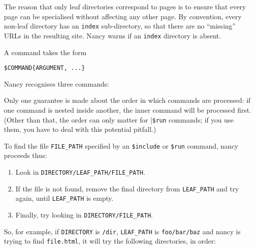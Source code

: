 \documentclass[english]{scrartcl}
\begin{document}
The reason that only leaf directories correspond to pages is to ensure that every page can be specialised without affecting any other page. By convention, every non-leaf directory has an \verb|index| sub-directory, so that there are no ``missing'' URLs in the resulting site. Nancy warns if an \verb|index| directory is absent.

A command takes the form

\begin{verbatim}
$COMMAND{ARGUMENT, ...}
\end{verbatim}

Nancy recognises three commands:


Only one guarantee is made about the order in which commands are processed: if one command is nested inside another, the inner command will be processed first. (Other than that, the order can only matter for |\verb|$run| commands; if you use them, you have to deal with this potential pitfall.)

To find the file \verb|FILE_PATH| specified by an \verb|$include| or \verb|$run| command, nancy proceeds thus:

\begin{enumerate}
\item Look in \verb|DIRECTORY/LEAF_PATH/FILE_PATH|.
\item If the file is not found, remove the final directory from \verb|LEAF_PATH| and try again, until \verb|LEAF_PATH| is empty.
\item Finally, try looking in \verb|DIRECTORY/FILE_PATH|.
\end{enumerate}

So, for example, if \verb|DIRECTORY| is \verb|/dir|, \verb|LEAF_PATH| is \verb|foo/bar/baz| and nancy is trying to find \verb|file.html|, it will try the following directories, in order:
\end{document}
